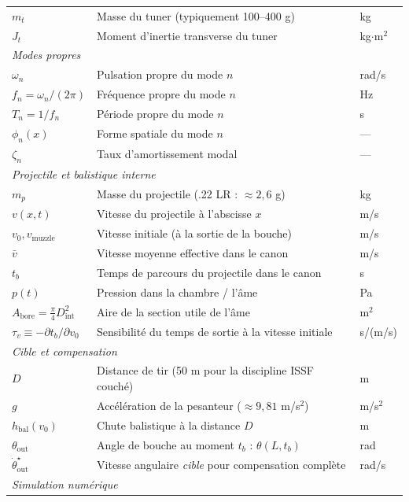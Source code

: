 \documentclass[12pt,a4paper]{article}
\begin{document}
\begin{center}
\begin{tabular}{l l l}
			$m_t$ & Masse du tuner (typiquement 100--400 g) & kg \\
			$J_t$ & Moment d'inertie transverse du tuner & kg$\cdot$m$^2$ \\
			\midrule
			\multicolumn{3}{l}{\emph{Modes propres}} \\
			$\omega_n$ & Pulsation propre du mode $n$ & rad/s \\
			$f_n = \omega_n/(2\pi)$ & Fréquence propre du mode $n$ & Hz \\
			$T_n = 1/f_n$ & Période propre du mode $n$ & s \\
			$\phi_n(x)$ & Forme spatiale du mode $n$ & --- \\
			$\zeta_n$ & Taux d'amortissement modal & --- \\
			\midrule
			\multicolumn{3}{l}{\emph{Projectile et balistique interne}} \\
			$m_p$ & Masse du projectile (.22 LR : $\approx 2{,}6$ g) & kg \\
			$v(x,t)$ & Vitesse du projectile à l'abscisse $x$ & m/s \\
			$v_0, v_\text{muzzle}$ & Vitesse initiale (à la sortie de la bouche) & m/s \\
			$\bar v$ & Vitesse moyenne effective dans le canon & m/s \\
			$t_b$ & Temps de parcours du projectile dans le canon & s \\
			$p(t)$ & Pression dans la chambre / l'âme & Pa \\
			$A_\text{bore} = \tfrac{\pi}{4} D_\text{int}^2$ & Aire de la section utile de l'âme & m$^2$ \\
			$\tau_v \equiv -\partial t_b/\partial v_0$ & Sensibilité du temps de sortie à la vitesse initiale & s/(m/s) \\
			\midrule
			\multicolumn{3}{l}{\emph{Cible et compensation}} \\
			$D$ & Distance de tir (50 m pour la discipline ISSF couché) & m \\
			$g$ & Accélération de la pesanteur ($\approx 9{,}81$ m/s$^2$) & m/s$^2$ \\
			$h_\text{bal}(v_0)$ & Chute balistique à la distance $D$ & m \\
			$\theta_\text{out}$ & Angle de bouche au moment $t_b$ : $\theta(L, t_b)$ & rad \\
			$\dot\theta_\text{out}^\star$ & Vitesse angulaire \emph{cible} pour compensation complète & rad/s \\
			\midrule
			\multicolumn{3}{l}{\emph{Simulation numérique}} \\

\end{tabular}
\end{center}
\end{document}
